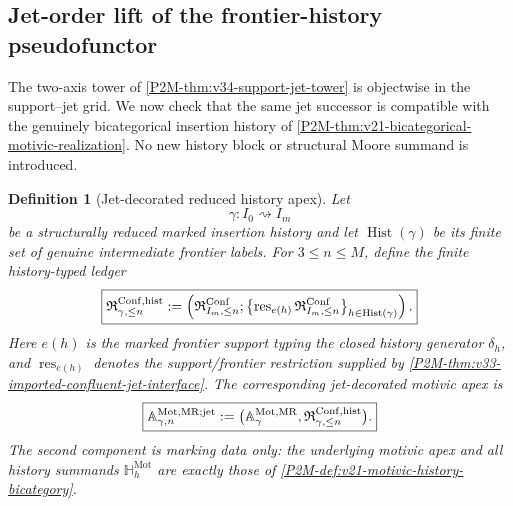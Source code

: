 \documentclass[11pt]{article}
\newtheorem{definition}[theorem]{Definition}
\theoremstyle{remark}
\newcommand{\Mot}{\mathrm{Mot}}
\newcommand{\MR}{\mathrm{MR}}
\begin{document}
\subsection{Jet-order lift of the frontier-history pseudofunctor}
\label{P2M-subsec:v35-history-jet-interchange}

The two-axis tower of \cref{P2M-thm:v34-support-jet-tower} is objectwise in the
support--jet grid.  We now check that the same jet successor is compatible
with the genuinely bicategorical insertion history of
\cref{P2M-thm:v21-bicategorical-motivic-realization}.  No new history block or
structural Moore summand is introduced.

\begin{definition}[Jet-decorated reduced history apex]
\label{P2M-def:v35-jet-decorated-history-apex}
Let
\[
 \gamma:I_0\rightsquigarrow I_m
\]
be a structurally reduced marked insertion history and let
$\operatorname{Hist}(\gamma)$ be its finite set of genuine intermediate
frontier labels.  For $3\le n\le M$, define the finite history-typed ledger
\begin{equation}
 \boxed{
 \mathfrak R^{\rm Conf,hist}_{\gamma,\le n}
 :=
 \left(
   \mathfrak R^{\rm Conf}_{I_m,\le n};
   \bigl\{
    \operatorname{res}_{e(h)}
    \mathfrak R^{\rm Conf}_{I_m,\le n}
   \bigr\}_{h\in\operatorname{Hist}(\gamma)}
 \right).}
 \label{P2M-eq:v35-history-typed-ledger}
\end{equation}
Here $e(h)$ is the marked frontier support typing the closed history generator
$\delta_h$, and $\operatorname{res}_{e(h)}$ denotes the support/frontier
restriction supplied by
\cref{P2M-thm:v33-imported-confluent-jet-interface}.  The corresponding
jet-decorated motivic apex is
\begin{equation}
 \boxed{
 \mathbb A^{\Mot,\MR;\mathrm{jet}}_{\gamma,n}
 :=
 \bigl(
   \mathbb A^{\Mot,\MR}_{\gamma},
   \mathfrak R^{\rm Conf,hist}_{\gamma,\le n}
 \bigr).}
 \label{P2M-eq:v35-jet-decorated-history-apex}
\end{equation}
The second component is marking data only: the underlying motivic apex and all
history summands $\mathbb H_h^{\Mot}$ are exactly those of
\cref{P2M-def:v21-motivic-history-bicategory}.
\end{definition}
\end{document}
